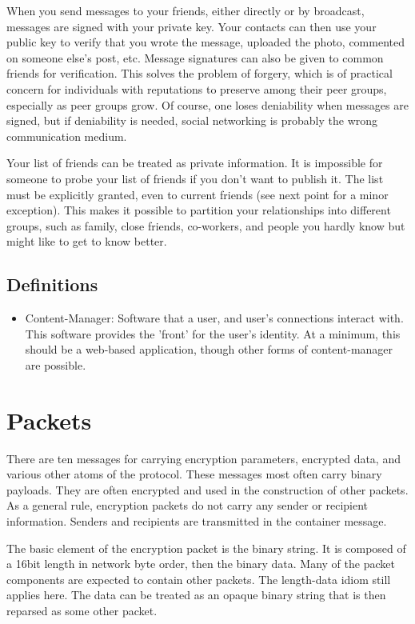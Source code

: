 \documentclass[letterpaper,11pt,oneside]{article}
\begin{document}
When you send messages to your friends, either directly or by broadcast,
messages are signed with your private key. Your contacts can then use your
public key to verify that you wrote the message, uploaded the photo, commented
on someone else's post, etc. Message signatures can also be given to common
friends for verification. This solves the problem of forgery, which is of
practical concern for individuals with reputations to preserve among their peer
groups, especially as peer groups grow. Of course, one loses deniability when
messages are signed, but if deniability is needed, social networking is
probably the wrong communication medium.

Your list of friends can be treated as private information. It is impossible
for someone to probe your list of friends if you don't want to publish it. The
list must be explicitly granted, even to current friends (see next point for a
minor exception). This makes it possible to partition your relationships into
different groups, such as family, close friends, co-workers, and people you
hardly know but might like to get to know better.

\subsection{Definitions}

\begin{itemize}

\item Content-Manager: Software that a user, and user's connections interact with.
This software provides the 'front' for the user's identity. At a minimum, this
should be a web-based application, though other forms of content-manager are
possible.

\end{itemize}

\section{Packets}

There are ten messages for carrying encryption parameters, encrypted data, and
various other atoms of the protocol. These messages most often carry binary
payloads. They are often encrypted and used in the construction of other
packets. As a general rule, encryption packets do not carry any sender or
recipient information. Senders and recipients are transmitted in the container
message.

The basic element of the encryption packet is the binary string. It is composed
of a 16bit length in network byte order, then the binary data. Many of the
packet components are expected to contain other packets. The length-data idiom
still applies here. The data can be treated as an opaque binary string that is
then reparsed as some other packet.
\end{document}
